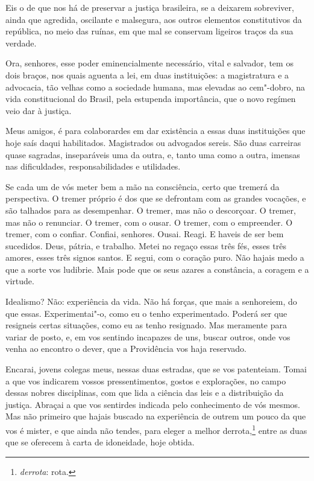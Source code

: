 Eis o de que nos há de preservar a justiça brasileira, se a
deixarem sobreviver, ainda que agredida, oscilante e malsegura, aos
outros elementos constitutivos da república, no meio das ruínas, em que
mal se conservam ligeiros traços da sua verdade.

Ora, senhores, esse poder eminencialmente necessário, vital e
salvador, tem os dois braços, nos quais aguenta a lei, em duas
instituições: a magistratura e a advocacia, tão velhas como a sociedade
humana, mas elevadas ao cem"-dobro, na vida constitucional do Brasil,
pela estupenda importância, que o novo regímen veio dar à justiça.

Meus amigos, é para colaborardes em dar existência a essas duas
instituições que hoje saís daqui habilitados. Magistrados ou advogados
sereis. São duas carreiras quase sagradas, inseparáveis uma da outra,
e, tanto uma como a outra, imensas nas dificuldades, responsabilidades
e utilidades.

Se cada um de vós meter bem a mão na consciência, certo que
tremerá da perspectiva. O tremer próprio é dos que se defrontam com as
grandes vocações, e são talhados para as desempenhar. O tremer, mas não
o descorçoar. O tremer, mas não o renunciar. O tremer, com o ousar. O
tremer, com o empreender. O tremer, com o confiar. Confiai, senhores.
Ousai. Reagi. E haveis de ser bem sucedidos. Deus, pátria, e trabalho.
Metei no regaço essas três fés, esses três amores, esses três signos
santos. E segui, com o coração puro. Não hajais medo a que a sorte vos
ludibrie. Mais pode que os seus azares a constância, a coragem e a virtude.

Idealismo? Não: experiência da vida. Não há forças, que mais a
senhoreiem, do que essas. Experimentai"-o, como eu o tenho
experimentado. Poderá ser que resigneis certas situações, como eu as
tenho resignado. Mas meramente para variar de posto, e, em vos sentindo
incapazes de uns, buscar outros, onde vos venha ao encontro o dever,
que a Providência vos haja reservado.

Encarai, jovens colegas meus, nessas duas estradas, que se vos
patenteiam. Tomai a que vos indicarem vossos pressentimentos, gostos e
explorações, no campo dessas nobres disciplinas, com que lida a ciência
das leis e a distribuição da justiça. Abraçai a que vos sentirdes
indicada pelo conhecimento de vós mesmos. Mas não primeiro que hajais
buscado na experiência de outrem um pouco da que vos é mister, e que
ainda não tendes, para eleger a melhor derrota,\footnote{ \textit{derrota}:
rota.} entre as duas que se oferecem à carta de
idoneidade, hoje obtida.

